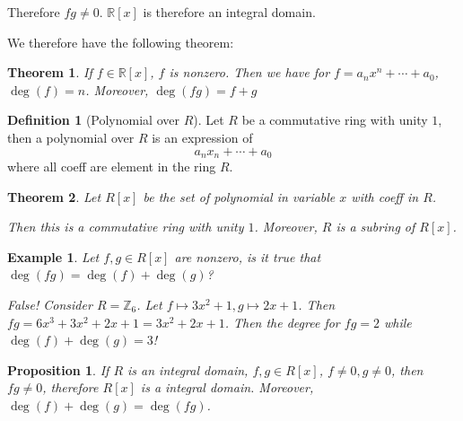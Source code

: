 \documentclass{article}
\theoremstyle{MyNonumberplain}
\theoremstyle{break}
\theoremstyle{break}
\newtheorem{theorem}{Theorem}[section]
\newtheorem{proposition}{Proposition}[section]
\newtheorem{example}{Example}[section]
\theoremstyle{break}
\theoremstyle{definition}
\theoremstyle{break}
\newtheorem{definition}{Definition}[section]
\begin{document}
Therefore $f g \neq 0$. $\mathbb{R} [x]$ is therefore an integral domain.

We therefore have the following theorem:

\begin{thmbox}
    \begin{theorem}
        If $f \in \mathbb{R} [x]$, $f$ is nonzero. Then we have for $f = a_n x^n +
        \cdots + a_0$, $\deg (f) = n$. Moreover, $\deg (f g) = f + g$
    \end{theorem}
\end{thmbox}

\begin{defbox}
    \begin{definition}[Polynomial over $R$]
        Let $R$ be a commutative ring with unity $1$, then a polynomial over $R$ is an
        expression of
        \[ a_n x_n + \cdots + a_0 \]
        where all coeff are element in the ring $R$.
    \end{definition}
\end{defbox}

\begin{thmbox}
    \begin{theorem}
        Let ${R} [x]$ be the set of polynomial in variable $x$ with coeff in
        $R$.
        
        Then this is a commutative ring with unity $1$. Moreover, $R$ is a subring of
        $R [x]$.
    \end{theorem}
\end{thmbox}
\begin{expbox}
    \begin{example}
        Let $f, g \in R [x]$ are nonzero, is it true that $\deg (f g) = \deg (f) +
        \deg (g)$?
        \begin{ansbox}
            False! Consider $R =\mathbb{Z}_6$. Let $f \mapsto 3 x^2 + 1, g \mapsto 2 x +
            1$. Then $f g = 6 x^3 + 3 x^2 + 2 x + 1 = 3 x^2 + 2 x + 1$. Then the degree
            for $f g = 2$ while $\deg (f) + \deg (g) = 3$!    
        \end{ansbox}
    \end{example}
\end{expbox}

\begin{thmbox}
    \begin{proposition}
        If $R$ is an integral domain, $f, g \in R [x]$, $f \neq 0, g \neq 0$, then $f
        g \neq 0$, therefore $R [x]$ is a integral domain. Moreover, $\deg (f) + \deg
        (g) = \deg (f g)$.
    \end{proposition}
\end{thmbox}
\end{document}
